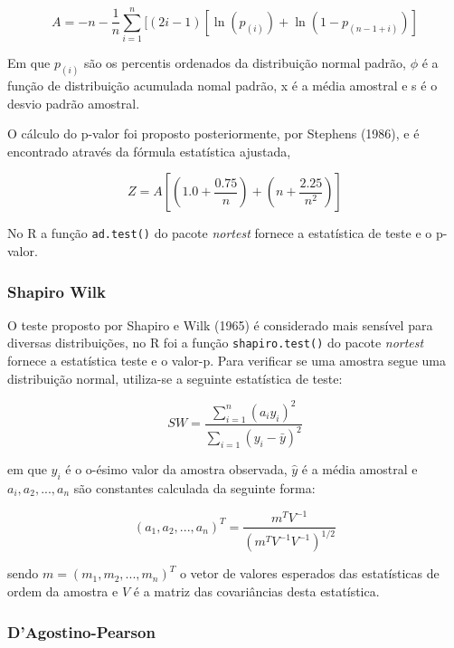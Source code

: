 \documentclass[a4paper,11pt]{article} %
\begin{document}
\begin{equation}
    A = -n - \frac{1}{n} \sum_{i=1}^{n} [(2i-1)[ \ln (p_{(i)}) + \ln(1- p_{(n-1+i)})]
\end{equation}

Em que $p_{(i)}$ são os percentis ordenados da distribuição normal padrão, $\phi$ é a função de distribuição acumulada nomal padrão, x é a média amostral e s é o desvio padrão amostral.\vskip0.3cm

O cálculo do p-valor foi proposto posteriormente, por Stephens (1986), e é encontrado através da fórmula estatística ajustada,

\begin{equation}
    Z = A \left[ \left(1.0 + \frac{0.75}{n} \right)+  \left(n+\frac{2.25}{n^{2}} \right) \right]
\end{equation}


No R a função \texttt{ad.test()} do pacote \textit{nortest} fornece a estatística de teste e o p-valor. \vskip0.3cm

\subsubsection{Shapiro Wilk}

O teste proposto por Shapiro e Wilk (1965) é considerado mais sensível para diversas distribuições, no R foi a função \texttt{shapiro.test()} do pacote \textit{nortest} fornece a estatística teste e o valor-p. Para verificar se uma amostra segue uma distribuição normal, utiliza-se a seguinte estatística de teste: 

\begin{equation}
    SW = \frac{\sum_{i=1}^{n} (a_{i}y_{i})^{2}}{\sum_{i=1}  (y_{i} - \bar{y})^{2}}
\end{equation}

em que $y_{i}$ é o o-ésimo valor da amostra observada, $\hat{y}$ é a média amostral e $a_{i},a_{2},...,a_{n}$ são constantes calculada da seguinte forma:

\begin{equation}
    (a_{1},a_{2},...,a_{n})^{T} = \frac{m^{T}V^{-1}}{(m^{T}V^{-1}V^{-1} )^{1/2}}
\end{equation}

sendo $m=(m_{1},m_{2},...,m_{n})^{T}$ o vetor de valores esperados das estatísticas de ordem da amostra e $V$ é a matriz das covariâncias desta estatística.\vskip0.3cm

\subsubsection{D’Agostino-Pearson}
\end{document}

